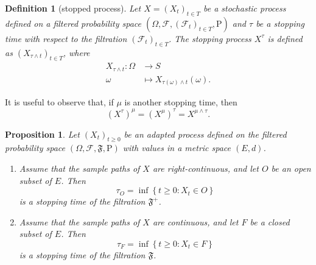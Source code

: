 \documentclass{report}
\newtheorem{definition}{Definition}[section]
\newtheorem{proposition}{Proposition}[section]
\theoremstyle{nonumberplain}
\begin{document}
\begin{definition}[stopped process]
	Let $X=(X_{t})_{t\in T}$ be a stochastic process defined on a filtered probability space $(\Omega,\mathcal{F},(\mathcal{F}_{t})_{t\in T},\mathrm{P})$ and $\tau$ be a stopping time with respect to the filtration $(\mathcal{F}_{t})_{t\in T}$. The stopping process $X^\tau$ is defined as $(X_{\tau \wedge t})_{t\in T}$, where
	\begin{align*}
	X_{\tau \wedge t}:\Omega&\longrightarrow S\\
	\omega&\longmapsto X_{\tau(\omega) \wedge t}(\omega).
	\end{align*}
\end{definition}
It is useful to observe that, if $\mu$ is another stopping time, then
\[
(X^\tau)^\mu=(X^\mu)^\tau=X^{\mu\wedge\tau}.
\]
\begin{proposition}
	Let $\left(X_{t}\right)_{t \geq 0}$ be an adapted process defined on the filtered probability space $(\Omega,\mathcal{F},\mathfrak{F},\mathrm{P})$ with values in a metric space $(E, d)$.
	\begin{enumerate}  
		\item Assume that the sample paths of $X$ are right-continuous, and let $O$ be an open subset of $E$. Then
		\[
		\tau_{O}=\inf \left\{t \geq 0: X_{t} \in O\right\}
		\]
		is a stopping time of the filtration $\mathfrak{F}^+$.
		\item Assume that the sample paths of $X$ are continuous, and let $F$ be a closed subset
		of $E$. Then
		\[
		\tau_{F}=\inf \left\{t \geq 0: X_{t} \in F\right\}
		\]
		is a stopping time of the filtration $\mathfrak{F}$.
	\end{enumerate}
\end{proposition}
\end{document}
